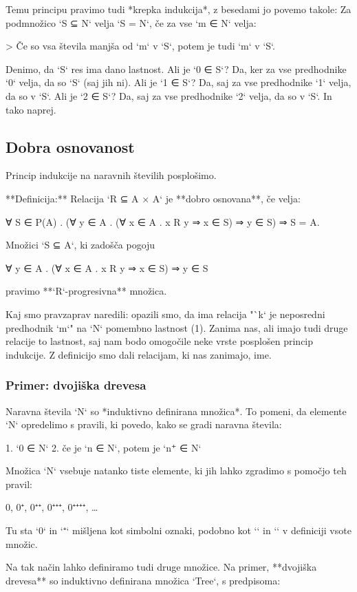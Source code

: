 Temu principu pravimo tudi *krepka indukcija*, z besedami jo povemo takole:
Za podmnožico `S ⊆ N` velja `S = N`, če za vse `m ∈ N` velja:

> Če so vsa števila manjša od `m` v `S`, potem je tudi `m` v `S`.

Denimo, da `S` res ima dano lastnost. Ali je `0 ∈ S`? Da, ker za vse predhodnike `0` velja, da
so `S` (saj jih ni). Ali je `1 ∈ S`? Da, saj za vse predhodnike `1` velja, da so v `S`. Ali je `2 ∈
S`? Da, saj za vse predhodnike `2` velja, da so v `S`. In tako naprej.

\subsection{Dobra osnovanost}

Princip indukcije na naravnih številih posplošimo.

**Definicija:** Relacija `R ⊆ A × A` je **dobro osnovana**, če velja:

    ∀ S ∈ P(A) . (∀ y ∈ A . (∀ x ∈ A . x R y ⇒ x ∈ S) ⇒ y ∈ S) ⇒ S = A.

Množici `S ⊆ A`, ki zadošča pogoju

    ∀ y ∈ A . (∀ x ∈ A . x R y ⇒ x ∈ S) ⇒ y ∈ S

pravimo **`R`-progresivna** množica.

Kaj smo pravzaprav naredili: opazili smo, da ima relacija "`k` je neposredni predhodnik
`m`" na `N` pomembno lastnost (1). Zanima nas, ali imajo tudi druge relacije to lastnost,
saj nam bodo omogočile neke vrste posplošen princip indukcije. Z definicijo smo dali
relacijam, ki nas zanimajo, ime.

\subsubsection{Primer: dvojiška drevesa}

Naravna števila `N` so *induktivno definirana množica*. To pomeni, da elemente `N`
opredelimo s pravili, ki povedo, kako se gradi naravna števila:

1. `0 ∈ N`
2. če je `n ∈ N`, potem je `n⁺ ∈ N`

Množica `N` vsebuje natanko tiste elemente, ki jih lahko zgradimo s pomočjo teh pravil:

    0, 0⁺, 0⁺⁺, 0⁺⁺⁺, 0⁺⁺⁺⁺, …

Tu sta `0` in `⁺` mišljena kot simbolni oznaki, podobno kot `\inl` in `\inr` v definiciji
vsote množic.

Na tak način lahko definiramo tudi druge množice. Na primer, **dvojiška drevesa** so
induktivno definirana množica `Tree`, s predpisoma:

